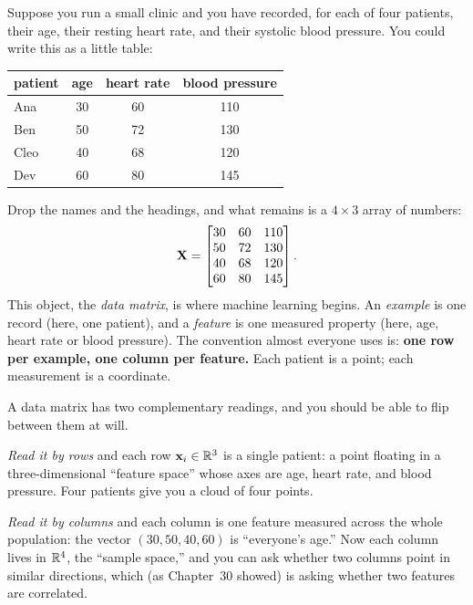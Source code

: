 Suppose you run a small clinic and you have recorded, for each of four patients, their
age, their resting heart rate, and their systolic blood pressure. You could write this
as a little table:

\begin{center}
\begin{tabular}{lccc}
\toprule
patient & age & heart rate & blood pressure \\
\midrule
Ana   & 30 & 60 & 110 \\
Ben   & 50 & 72 & 130 \\
Cleo  & 40 & 68 & 120 \\
Dev   & 60 & 80 & 145 \\
\bottomrule
\end{tabular}
\end{center}

Drop the names and the headings, and what remains is a $4\times 3$ array of numbers:
\[
\mathbf{X} =
\begin{bmatrix}
30 & 60 & 110 \\
50 & 72 & 130 \\
40 & 68 & 120 \\
60 & 80 & 145
\end{bmatrix}.
\]
This object, the \emph{data matrix}, is where machine learning begins. An
\emph{example} is one record (here, one patient), and a \emph{feature} is one measured
property (here, age, heart rate or blood pressure). The convention almost everyone uses
is: \textbf{one row per example, one column per feature.} Each patient is a point; each
measurement is a coordinate.

\begin{intuitionbox}
A data matrix has two complementary readings, and you should be able to flip between
them at will.

\emph{Read it by rows} and each row $\mathbf{x}_i \in \mathbb{R}^{3}$ is a single patient: a point
floating in a three-dimensional ``feature space'' whose axes are age, heart rate, and
blood pressure. Four patients give you a cloud of four points.

\emph{Read it by columns} and each column is one feature measured across the whole
population: the vector $(30,50,40,60)$ is ``everyone's age.'' Now each column lives in
$\mathbb{R}^{4}$, the ``sample space,'' and you can ask whether two columns point in similar
directions, which (as Chapter~30 showed) is asking whether two features are
correlated.
\end{intuitionbox}

